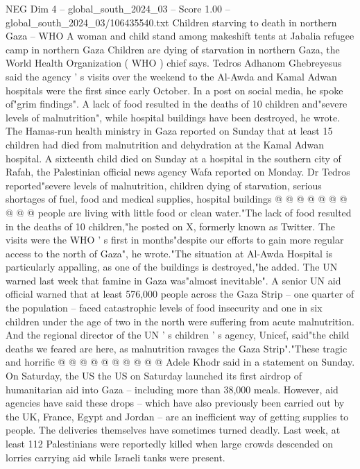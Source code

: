 \begin{textsample}{NEG Dim 4 – global\_south\_2024\_03 – Score 1.00 – global\_south\_2024\_03/106435540.txt}  \label{ex:f4_neg_358}
Children starving to death in northern Gaza -- WHO A woman and child stand among makeshift tents at Jabalia refugee camp in northern Gaza Children are dying of starvation in northern Gaza, the World Health Organization ( WHO ) chief says.
Tedros Adhanom Ghebreyesus said the agency ' s visits over the weekend to the Al-Awda and Kamal Adwan hospitals were the first since early October.
In a post on social media, he spoke of"grim findings".
A lack of food resulted in the deaths of 10 children and"severe levels of malnutrition", while hospital buildings have been destroyed, he wrote.
The Hamas-run health ministry in Gaza reported on Sunday that at least 15 children had died from malnutrition and dehydration at the Kamal Adwan hospital.
A sixteenth child died on Sunday at a hospital in the southern city of Rafah, the Palestinian official news agency Wafa reported on Monday.
Dr Tedros reported"severe levels of malnutrition, children dying of starvation, serious shortages of fuel, food and medical supplies, hospital buildings @ @ @ @ @ @ @ @ @ @ people are living with little food or clean water."The lack of food resulted in the deaths of 10 children,"he posted on X, formerly known as Twitter.
The visits were the WHO ' s first in months"despite our efforts to gain more regular access to the north of Gaza", he wrote."The situation at Al-Awda Hospital is particularly appalling, as one of the buildings is destroyed,"he added.
The UN warned last week that famine in Gaza was"almost inevitable".
A senior UN aid official warned that at least 576,000 people across the Gaza Strip -- one quarter of the population -- faced catastrophic levels of food insecurity and one in six children under the age of two in the north were suffering from acute malnutrition.
And the regional director of the UN ' s children ' s agency, Unicef, said"the child deaths we feared are here, as malnutrition ravages the Gaza Strip"."These tragic and horrific @ @ @ @ @ @ @ @ @ @ Adele Khodr said in a statement on Sunday.
On Saturday, the US the US on Saturday launched its first airdrop of humanitarian aid into Gaza -- including more than 38,000 meals.
However, aid agencies have said these drops -- which have also previously been carried out by the UK, France, Egypt and Jordan -- are an inefficient way of getting supplies to people.
The deliveries themselves have sometimes turned deadly.
Last week, at least 112 Palestinians were reportedly killed when large crowds descended on lorries carrying aid while Israeli tanks were present.

\end{textsample}
